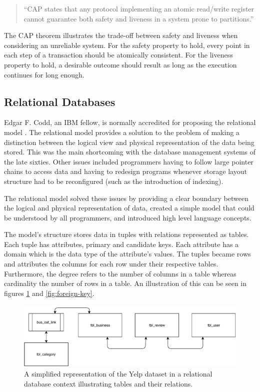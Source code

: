 \begin{quote}
    ``CAP states that any protocol implementing an atomic read/write register cannot guarantee both safety and liveness in a system prone to partitions.''
\end{quote}

The CAP theorem illustrates the trade-off between safety and liveness when considering an unreliable system. For the safety property to hold, every point in each step of a transaction should be atomically consistent. For the liveness property to hold, a desirable outcome should result as long as the execution continues for long enough.

\subsection{Relational Databases}

Edgar F. Codd, an IBM fellow, is normally accredited for proposing the relational model \cite{relational-db}. The relational model provides a solution to the problem of making a distinction between the logical view and physical representation of the data being stored. This was the main shortcoming with the database management systems of the late sixties. Other issues included programmers having to follow large pointer chains to access data and having to redesign programs whenever storage layout structure had to be reconfigured (such as the introduction of indexing).

The relational model solved these issues by providing a clear boundary between the logical and physical representation of data, created a simple model that could be understood by all programmers, and introduced high level language concepts.

The model's structure stores data in tuples with relations represented as tables. Each tuple has attributes, primary and candidate keys. Each attribute has a domain which is the data type of the attribute's values. The tuples became rows and attributes the columns for each row under their respective tables. Furthermore, the degree refers to the number of columns in a table whereas cardinality the number of rows in a table. An illustration of this can be seen in figures \ref{fig:relational-database} and \ref{fig:foreign-key}.

\begin{figure}[h]
    \centering
    \includegraphics[width=15cm]{img/relational-database.pdf}
    \caption{A simplified representation of the Yelp dataset in a relational database context illustrating tables and their relations.}
    \label{fig:relational-database}
\end{figure}

